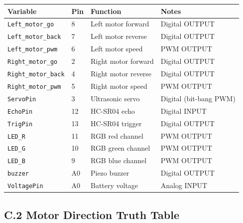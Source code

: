 \documentclass[12pt,a4paper]{article}
\begin{document}
\begin{center}
\renewcommand{\arraystretch}{1.3}
\begin{tabular}{L{3.8cm} C{1.5cm} L{3.8cm} L{4cm}}
\toprule
{}
\color{white}\textbf{Variable} &
\color{white}\textbf{Pin} &
\color{white}\textbf{Function} &
\color{white}\textbf{Notes} \\
\midrule
\texttt{Left\_motor\_go}    & 8  & Left motor forward  & Digital OUTPUT \\
\texttt{Left\_motor\_back}  & 7  & Left motor reverse  & Digital OUTPUT \\
\texttt{Left\_motor\_pwm}   & 6  & Left motor speed    & PWM OUTPUT \\
\texttt{Right\_motor\_go}   & 2  & Right motor forward & Digital OUTPUT \\
\texttt{Right\_motor\_back} & 4  & Right motor reverse & Digital OUTPUT \\
\texttt{Right\_motor\_pwm}  & 5  & Right motor speed   & PWM OUTPUT \\
\texttt{ServoPin}           & 3  & Ultrasonic servo    & Digital (bit-bang PWM) \\
\texttt{EchoPin}            & 12 & HC-SR04 echo        & Digital INPUT \\
\texttt{TrigPin}            & 13 & HC-SR04 trigger     & Digital OUTPUT \\
\texttt{LED\_R}             & 11 & RGB red channel     & PWM OUTPUT \\
\texttt{LED\_G}             & 10 & RGB green channel   & PWM OUTPUT \\
\texttt{LED\_B}             & 9  & RGB blue channel    & PWM OUTPUT \\
\texttt{buzzer}             & A0 & Piezo buzzer        & Digital OUTPUT \\
\texttt{VoltagePin}         & A0 & Battery voltage     & Analog INPUT \\
\bottomrule
\end{tabular}
\end{center}

\subsection*{C.2 \quad Motor Direction Truth Table}
\end{document}
